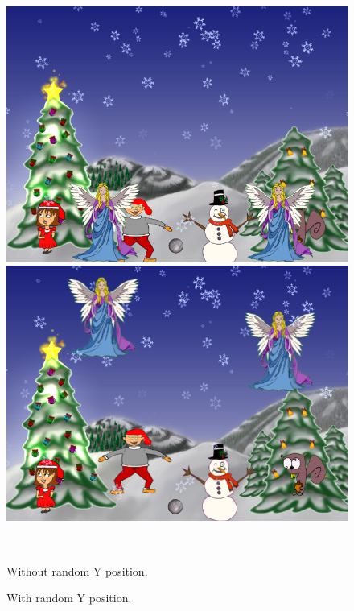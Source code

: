 \begin{figure}[htbp] \centering
\begin{minipage}[b]{0.45\textwidth} \centering
\includegraphics[width=1.00\textwidth]{Pictures/Design/without_randomY} %
\end{minipage} \hfill
\begin{minipage}[b]{0.45\textwidth} \centering
\includegraphics[width=1.00\textwidth]{Pictures/Design/with_randomY} %
\end{minipage} \\ %
\begin{minipage}[t]{0.45\textwidth}
\caption{Without random Y position.} %
\label{fig:withoutRandomY}
\end{minipage} \hfill
\begin{minipage}[t]{0.45\textwidth}
\caption{With random Y position.} %
\label{fig:withRandomY}
\end{minipage}
\end{figure}

